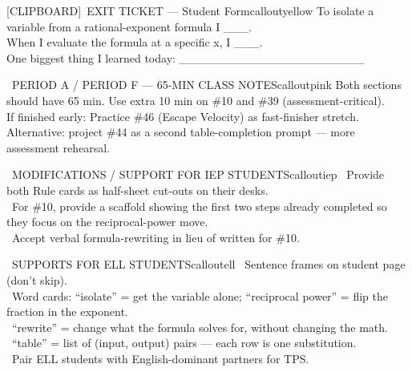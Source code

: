 \documentclass[11pt]{article}
\newcommand{\IconClipboard}{[CLIPBOARD]}
\begin{document}
\begin{callout}{\IconClipboard\ EXIT TICKET --- Student Form}{calloutyellow}
To isolate a variable from a rational-exponent formula I \_\_\_.\\
When I evaluate the formula at a specific x, I \_\_\_.\\
One biggest thing I learned today: \_\_\_\_\_\_\_\_\_\_\_\_\_\_\_\_\_\_\_\_\_\_
\end{callout}

\clearpage

\begin{callout}{\IconClock\ PERIOD A / PERIOD F --- 65-MIN CLASS NOTES}{calloutpink}
Both sections should have 65 min. Use extra 10 min on \#10 and \#39 (assessment-critical).\\
If finished early: Practice \#46 (Escape Velocity) as fast-finisher stretch.\\
Alternative: project \#44 as a second table-completion prompt --- more assessment rehearsal.
\end{callout}

\begin{callout}{\IconPuzzle\ MODIFICATIONS / SUPPORT FOR IEP STUDENTS}{calloutiep}
\textbullet\ Provide both Rule cards as half-sheet cut-outs on their desks.\\
\textbullet\ For \#10, provide a scaffold showing the first two steps already completed so they focus on the reciprocal-power move.\\
\textbullet\ Accept verbal formula-rewriting in lieu of written for \#10.
\end{callout}

\begin{callout}{\IconGlobe\ SUPPORTS FOR ELL STUDENTS}{calloutell}
\textbullet\ Sentence frames on student page (don't skip).\\
\textbullet\ Word cards: ``isolate'' = get the variable alone; ``reciprocal power'' = flip the fraction in the exponent.\\
\textbullet\ ``rewrite'' = change what the formula solves for, without changing the math.\\
\textbullet\ ``table'' = list of (input, output) pairs --- each row is one substitution.\\
\textbullet\ Pair ELL students with English-dominant partners for TPS.
\end{callout}
\end{document}
